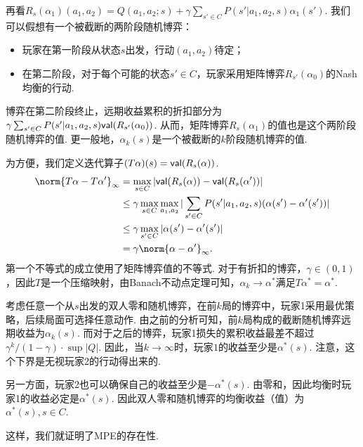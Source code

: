 再看$R_s(\alpha_1)(a_1,a_2)=Q(a_1,a_2;s)+\gamma\sum_{s'\in C}P(s'|a_1,a_2,s)\alpha_1(s')$. 我们可以假想有一个被截断的两阶段随机博弈：
        \begin{itemize}
            \item 玩家在第一阶段从状态$s$出发，行动$(a_1,a_2)$待定；\item 在第二阶段，对于每个可能的状态$s'\in C$，玩家采用矩阵博弈$R_{s'}(\alpha_0)$的Nash均衡的行动.
        \end{itemize} 
博弈在第二阶段终止，远期收益累积的折扣部分为$\gamma \sum_{s'\in C}P(s'|a_1,a_2,s)\mathsf{val}(R_{s'}(\alpha_0))$. 从而，矩阵博弈$R_s(\alpha_1)$的值也是这个两阶段随机博弈的值. 更一般地，$\alpha_{k}(s)$是一个被截断的$k$阶段随机博弈的值.

为方便，我们定义迭代算子$(T\alpha)(s) = \mathsf{val}(R_s(\alpha))$.
        \begin{align*}
            \norm{T\alpha-T\alpha'}_\infty &= \max_{s\in C}|\val (R_s(\alpha)) - \val(R_s(\alpha'))| \\
            &\leq \gamma \max_{s\in C} \max_{a_1,a_2}|\sum_{s'\in C}P(s'|a_1,a_2,s)(\alpha(s') - \alpha'(s'))| \\
            &\leq \gamma \max_{s'\in C} |\alpha(s') - \alpha'(s')| \\
            &= \gamma \norm{\alpha-\alpha'}_\infty.
        \end{align*}
第一个不等式的成立使用了矩阵博弈值的不等式. 对于有折扣的博弈，$\gamma\in (0,1)$，因此$T$是一个压缩映射，由Banach不动点定理可知，$\alpha_k\to \alpha^*$满足$T\alpha^*=\alpha^*$.

考虑任意一个从$s$出发的双人零和随机博弈，在前$k$局的博弈中，玩家1采用最优策略，后续局面可选择任意动作. 由之前的分析可知，前$k$局构成的截断随机博弈远期收益为$\alpha_k(s)$. 而对于之后的博弈，玩家1损失的累积收益最差不超过$\gamma^k/(1-\gamma)\cdot \sup|Q|$. 因此，当$k\to\infty$时，玩家$1$的收益至少是$\alpha^*(s)$. 注意，这个下界是无视玩家2的行动得出来的.

另一方面，玩家2也可以确保自己的收益至少是$-\alpha^*(s)$. 由零和，因此均衡时玩家1的收益必定是$\alpha^*(s)$. 因此双人零和随机博弈的均衡收益（值）为$\alpha^*(s),s\in C$.

这样，我们就证明了MPE的存在性. 

